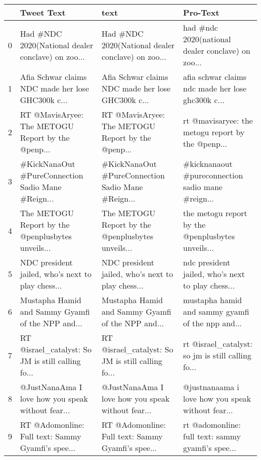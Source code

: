 \begin{tabular}{llll}
\toprule
{} &                                         Tweet Text &                                               text &                                           Pro-Text \\
\midrule
0 &  Had \#NDC 2020(National dealer conclave) on zoo... &  Had \#NDC 2020(National dealer conclave) on zoo... &  had \#ndc 2020(national dealer conclave) on zoo... \\
1 &  Afia Schwar claims NDC made her lose GHC300k c... &  Afia Schwar claims NDC made her lose GHC300k c... &  afia schwar claims ndc made her lose ghc300k c... \\
2 &  RT @MavisAryee: The METOGU Report by the @penp... &  RT @MavisAryee: The METOGU Report by the @penp... &  rt @mavisaryee: the metogu report by the @penp... \\
3 &  \#KickNanaOut \#PureConnection Sadio Mane \#Reign... &  \#KickNanaOut \#PureConnection Sadio Mane \#Reign... &  \#kicknanaout \#pureconnection sadio mane \#reign... \\
4 &  The METOGU Report by the @penplusbytes unveils... &  The METOGU Report by the @penplusbytes unveils... &  the metogu report by the @penplusbytes unveils... \\
5 &  NDC president jailed, who’s next to play chess... &  NDC president jailed, who’s next to play chess... &  ndc president jailed, who’s next to play chess... \\
6 &  Mustapha Hamid and Sammy Gyamfi of the NPP and... &  Mustapha Hamid and Sammy Gyamfi of the NPP and... &  mustapha hamid and sammy gyamfi of the npp and... \\
7 &  RT @israel\_catalyst: So JM is still calling fo... &  RT @israel\_catalyst: So JM is still calling fo... &  rt @israel\_catalyst: so jm is still calling fo... \\
8 &  @JustNanaAma I love how you speak without fear... &  @JustNanaAma I love how you speak without fear... &  @justnanaama i love how you speak without fear... \\
9 &  RT @Adomonline: Full text: Sammy Gyamfi’s spee... &  RT @Adomonline: Full text: Sammy Gyamfi’s spee... &  rt @adomonline: full text: sammy gyamfi’s spee... \\
\bottomrule
\end{tabular}
